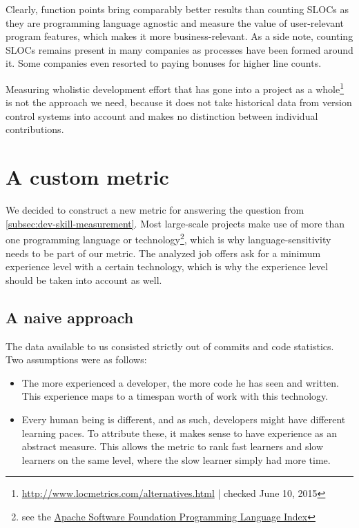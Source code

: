 Clearly, function points bring comparably better results than counting SLOCs as they are programming language agnostic and measure the value of user-relevant program features, which makes it more business-relevant. As a side note, counting SLOCs remains present in many companies as processes have been formed around it. Some companies even resorted to paying bonuses for higher line counts\cite{am:2009}.
\newline

Measuring wholistic development effort that has gone into a project as a whole\footnote{\url{http://www.locmetrics.com/alternatives.html} | checked June 10, 2015} is not the approach we need, because it does not take historical data from version control systems into account and makes no distinction between individual contributions.

\section{A custom metric}
We decided to construct a new metric for answering the question from \ref{subsec:dev-skill-measurement}. Most large-scale projects make use of more than one programming language or technology\footnote{see \eg the \href{http://projects.apache.org/indexes/language.html}{Apache Software Foundation Programming Language Index}}, which is why language-sensitivity needs to be part of our metric. The analyzed job offers ask for a minimum experience level with a certain technology, which is why the experience level should be taken into account  as well.

\subsection{A naive approach}
The data available to us consisted strictly out of commits and code statistics. Two assumptions were as follows:

\begin{itemize}
 \item The more experienced a developer, the more code he has seen and written. This experience maps to a timespan worth of work with this technology.
 \item Every human being is different, and as such, developers might have different learning paces. To attribute these, it makes sense to have experience as an abstract measure. This allows the metric to rank fast learners and slow learners on the same level, where the slow learner simply had more time.
\end{itemize}

